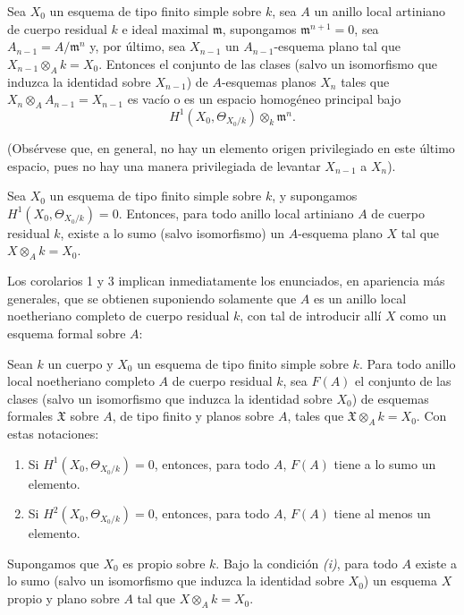  Sea $X_0$ un esquema de tipo finito simple sobre $k$, sea
$A$ un anillo local artiniano de cuerpo residual $k$ e ideal maximal
$\mathfrak m$, supongamos $\mathfrak m^{n+1}=0$, sea
$A_{n-1}=A/\mathfrak m^n$ y, por último, sea $X_{n-1}$ un
$A_{n-1}$-esquema plano tal que $X_{n-1}\otimes_A k=X_0$. Entonces el conjunto
de las clases (salvo un isomorfismo que induzca la identidad sobre $X_{n-1}$)
de $A$-esquemas planos $X_n$ tales que
$X_n\otimes_A A_{n-1}=X_{n-1}$ es vacío o es un espacio homogéneo principal
bajo
\[
  H^1(X_0,\Theta_{X_0/k})\otimes_k\mathfrak m^n.
\]

(Obsérvese que, en general, no hay un elemento origen privilegiado en este
último espacio, pues no hay una manera privilegiada de levantar $X_{n-1}$ a
$X_n$).

 Sea $X_0$ un esquema de tipo finito simple sobre $k$, y
supongamos $H^1(X_0,\Theta_{X_0/k})=0$. Entonces, para todo anillo local
artiniano $A$ de cuerpo residual $k$, existe a lo sumo (salvo isomorfismo) un
$A$-esquema plano $X$ tal que $X\otimes_A k=X_0$.

Los corolarios 1 y 3 implican inmediatamente los enunciados, en apariencia más
generales, que se obtienen suponiendo solamente que $A$ es un anillo local
noetheriano completo de cuerpo residual $k$, con tal de introducir allí $X$
como un esquema formal sobre $A$:

 Sean $k$ un cuerpo y $X_0$ un esquema de tipo finito simple
sobre $k$. Para todo anillo local noetheriano completo $A$ de cuerpo residual
$k$, sea $F(A)$ el conjunto de las clases (salvo un isomorfismo que induzca la
identidad sobre $X_0$) de esquemas formales $\mathfrak X$ sobre $A$, de tipo
finito y planos sobre $A$, tales que $\mathfrak X\otimes_A k=X_0$. Con estas
notaciones:
\begin{enumerate}
  \item[\textit{i.}] Si $H^1(X_0,\Theta_{X_0/k})=0$, entonces, para todo $A$,
    $F(A)$ tiene a lo sumo un elemento.
  \item[\textit{ii.}] Si $H^2(X_0,\Theta_{X_0/k})=0$, entonces, para todo $A$,
    $F(A)$ tiene al menos un elemento.
\end{enumerate}

 Supongamos que $X_0$ es propio sobre $k$. Bajo la
condición \textit{(i)}, para todo $A$ existe a lo sumo (salvo un isomorfismo que
induzca la identidad sobre $X_0$) un esquema $X$ propio y plano sobre $A$ tal
que $X\otimes_A k=X_0$.

